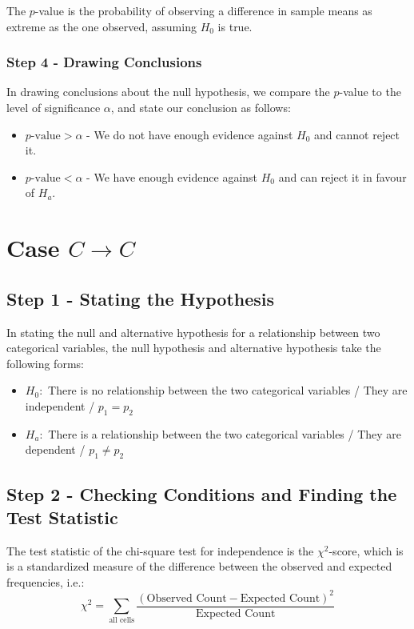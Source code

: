 \documentclass[12pt letter]{report}
\begin{document}
The $p$-value is the probability of observing a difference in sample means as extreme as the one observed, assuming
$H_0$ is true.

\subsubsection{Step 4 - Drawing Conclusions}

In drawing conclusions about the null hypothesis, we compare the $p$-value to the level of significance $\alpha $,
and state our conclusion as follows:
\begin{itemize}
  \item $p\text{-value} > \alpha$ - We do not have enough evidence against $H_0$ and cannot reject it.
  \item $p\text{-value} < \alpha$ - We have enough evidence against $H_0$ and can reject it in favour of $H_a$.
\end{itemize}

\section{Case $C \to C$}

\subsection{Step 1 - Stating the Hypothesis}

In stating the null and alternative hypothesis for a relationship between two categorical variables, the null hypothesis
and alternative hypothesis take the following forms:
\begin{itemize}
  \item $H_0:$ There is no relationship between the two categorical variables / They are independent / $p_1 = p_2$
  \item $H_a:$  There is a relationship between the two categorical variables / They are dependent / $p_1 \neq p_2$
\end{itemize}

\subsection{Step 2 - Checking Conditions and Finding the Test Statistic}

The test statistic of the chi-square test for independence is the $\chi^2$-score, which is is a standardized measure of
the difference between the observed and expected frequencies, i.e.:
\[
  \chi^2 = \displaystyle\sum_{\text{all cells}} \frac{\left( \text{Observed Count} - \text{Expected Count} \right)^2 }{\text{Expected Count}}
\]
\end{document}
